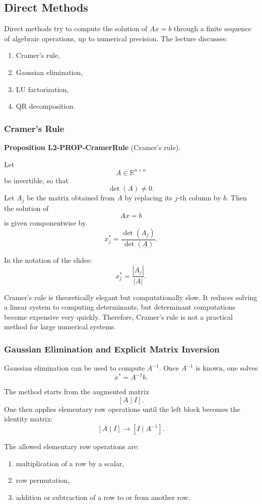 \documentclass[10pt, letterpaper]{article}
\newcommand{\R}{\mathbb{R}}
\newcommand{\CustomHeading}[3]{%
  \par\medskip\noindent%
  \textbf{#1 #2} \textnormal{(#3)}.\enskip%
}
\newenvironment{PROP}[2]{\CustomHeading{Proposition}{#1}{#2}}{}
\begin{document}
\subsection{Direct Methods}

Direct methods try to compute the solution of \(Ax=b\) through a finite sequence of algebraic operations, up to numerical precision. The lecture discusses:
\begin{enumerate}
    \item Cramer's rule,
    \item Gaussian elimination,
    \item LU factorization,
    \item QR decomposition.
\end{enumerate}

\subsubsection{Cramer's Rule}

\begin{PROP}{L2-PROP-CramerRule}{Cramer's rule}
Let
\[
A\in\R^{n\times n}
\]
be invertible, so that
\[
\det(A)\neq 0.
\]
Let \(A_j\) be the matrix obtained from \(A\) by replacing its \(j\)-th column by \(b\). Then the solution of
\[
Ax=b
\]
is given componentwise by
\[
x_j^\ast=\frac{\det(A_j)}{\det(A)}.
\]
\end{PROP}

In the notation of the slides:
\[
x_j^\ast=\frac{|A_j|}{|A|}.
\]

Cramer's rule is theoretically elegant but computationally slow. It reduces solving a linear system to computing determinants, but determinant computations become expensive very quickly. Therefore, Cramer's rule is not a practical method for large numerical systems.

\subsubsection{Gaussian Elimination and Explicit Matrix Inversion}

Gaussian elimination can be used to compute \(A^{-1}\). Once \(A^{-1}\) is known, one solves
\[
x^\ast=A^{-1}b.
\]

The method starts from the augmented matrix
\[
[A\mid I].
\]
One then applies elementary row operations until the left block becomes the identity matrix:
\[
[A\mid I]\longrightarrow [I\mid A^{-1}].
\]

The allowed elementary row operations are:
\begin{enumerate}
    \item multiplication of a row by a scalar,
    \item row permutation,
    \item addition or subtraction of a row to or from another row.
\end{enumerate}
\end{document}
